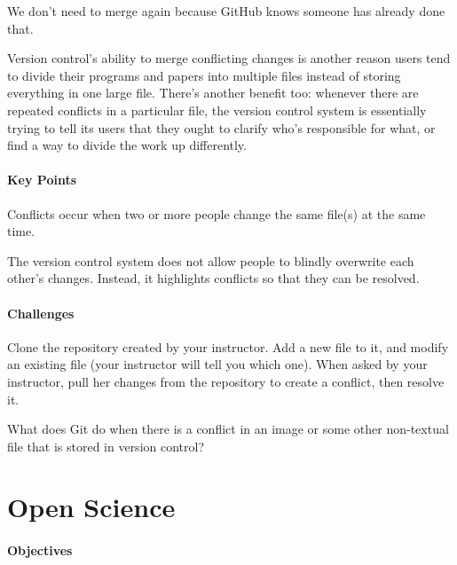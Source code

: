 \documentclass{book}
\begin{document}
We don't need to merge again because GitHub knows someone has already
done that.

Version control's ability to merge conflicting changes is another reason
users tend to divide their programs and papers into multiple files
instead of storing everything in one large file. There's another benefit
too: whenever there are repeated conflicts in a particular file, the
version control system is essentially trying to tell its users that they
ought to clarify who's responsible for what, or find a way to divide the
work up differently.

\mbox{}\paragraph{Key Points}

\begin{swcitemize}
\item
  Conflicts occur when two or more people change the same file(s) at the
  same time.
\item
  The version control system does not allow people to blindly overwrite
  each other's changes. Instead, it highlights conflicts so that they
  can be resolved.
\end{swcitemize}

\mbox{}\paragraph{Challenges}

\begin{swcenumerate}
\item
  Clone the repository created by your instructor. Add a new file to it,
  and modify an existing file (your instructor will tell you which one).
  When asked by your instructor, pull her changes from the repository to
  create a conflict, then resolve it.
\item
  What does Git do when there is a conflict in an image or some other
  non-textual file that is stored in version control?
\end{swcenumerate}

\section{Open Science}

\mbox{}\paragraph{Objectives}
\end{document}
